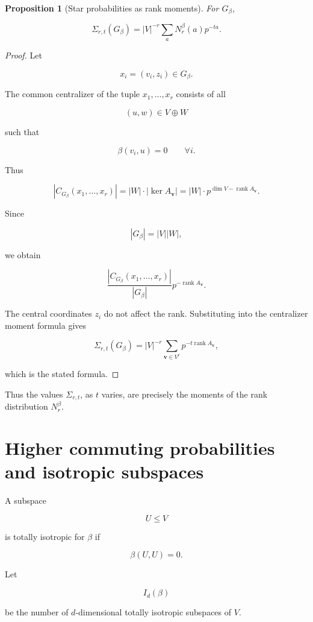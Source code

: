 \documentclass[11pt]{article}
\newtheorem{proposition}[theorem]{Proposition}
\begin{document}
\begin{proposition}[Star probabilities as rank moments]

For $G_\beta$,

\[
\Sigma_{r,t}(G_\beta)=
|V|^{-r}
\sum_a
N_r^\beta(a)p^{-ta}.
\]

\end{proposition}
\begin{proof}

Let

\[
x_i=(v_i,z_i)\in G_\beta.
\]

The common centralizer of the tuple $x_1,\dots,x_r$ consists of all

\[
(u,w)\in V\oplus W
\]

such that

\[
\beta(v_i,u)=0
\qquad
\forall i.
\]

Thus

\[
|C_{G_\beta}(x_1,\dots,x_r)|
=|W|\cdot |\ker A_{\mathbf v}|
=|W|\cdot p^{\dim V-\operatorname{rank}A_{\mathbf v}}.
\]

Since

\[
|G_\beta|=|V||W|,
\]

we obtain

\[
\frac{|C_{G_\beta}(x_1,\dots,x_r)|}{|G_\beta|}
p^{-\operatorname{rank}A_{\mathbf v}}.
\]

The central coordinates $z_i$ do not affect the rank. Substituting into the centralizer moment formula gives

\[
\Sigma_{r,t}(G_\beta)=
|V|^{-r}
\sum_{\mathbf v\in V^r}
p^{-t\operatorname{rank}A_{\mathbf v}},
\]

which is the stated formula.
\end{proof}

Thus the values $\Sigma_{r,t}$, as $t$ varies, are precisely the moments of the rank distribution $N_r^\beta$.

\section{Higher commuting probabilities and isotropic subspaces}

A subspace

\[
U\le V
\]

is totally isotropic for $\beta$ if

\[
\beta(U,U)=0.
\]

Let

\[
I_d(\beta)
\]

be the number of $d$-dimensional totally isotropic subspaces of $V$.
\end{document}
